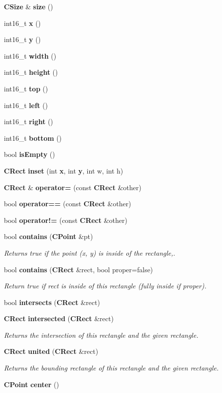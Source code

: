 \begin{DoxyCompactItemize}
\item 
{\bf C\+Size} \& {\bf size} ()
\item 
int16\+\_\+t {\bf x} ()
\item 
int16\+\_\+t {\bf y} ()
\item 
int16\+\_\+t {\bf width} ()
\item 
int16\+\_\+t {\bf height} ()
\item 
int16\+\_\+t {\bf top} ()
\item 
int16\+\_\+t {\bf left} ()
\item 
int16\+\_\+t {\bf right} ()
\item 
int16\+\_\+t {\bf bottom} ()
\item 
bool {\bf is\+Empty} ()
\item 
{\bf C\+Rect} {\bf inset} (int {\bf x}, int {\bf y}, int w, int h)
\item 
{\bf C\+Rect} \& {\bf operator=} (const {\bf C\+Rect} \&other)
\item 
bool {\bf operator==} (const {\bf C\+Rect} \&other)
\item 
bool {\bf operator!=} (const {\bf C\+Rect} \&other)
\item 
bool {\bf contains} ({\bf C\+Point} \&pt)
\begin{DoxyCompactList}\small\item\em Returns true if the point (x, y) is inside of the rectangle,. \end{DoxyCompactList}\item 
bool {\bf contains} ({\bf C\+Rect} \&rect, bool proper=false)
\begin{DoxyCompactList}\small\item\em Return true if rect is inside of this rectangle (fully inside if proper). \end{DoxyCompactList}\item 
bool {\bf intersects} ({\bf C\+Rect} \&rect)
\item 
{\bf C\+Rect} {\bf intersected} ({\bf C\+Rect} \&rect)
\begin{DoxyCompactList}\small\item\em Returns the intersection of this rectangle and the given rectangle. \end{DoxyCompactList}\item 
{\bf C\+Rect} {\bf united} ({\bf C\+Rect} \&rect)
\begin{DoxyCompactList}\small\item\em Returns the bounding rectangle of this rectangle and the given rectangle. \end{DoxyCompactList}\item 
{\bf C\+Point} {\bf center} ()
\end{DoxyCompactItemize}
